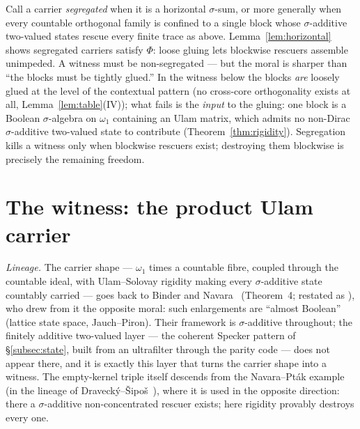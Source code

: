 \begin{remark}\label{rem:segregated}
Call a carrier \emph{segregated} when it is a horizontal $\sigma$-sum, or more
generally when every countable orthogonal family is confined to a single block
whose $\sigma$-additive two-valued states rescue every finite trace as above.
Lemma~\ref{lem:horizontal} shows segregated carriers satisfy $\Phi$: loose
gluing lets blockwise rescuers assemble unimpeded. A witness must be
non-segregated --- but the moral is sharper than ``the blocks must be tightly
glued.'' In the witness below the blocks \emph{are} loosely glued at the level of
the contextual pattern (no cross-core orthogonality exists at all,
Lemma~\ref{lem:table}(IV)); what fails is the \emph{input} to the gluing: one
block is a Boolean $\sigma$-algebra on $\omega_1$ containing an Ulam matrix,
which admits no non-Dirac $\sigma$-additive two-valued state to contribute
(Theorem~\ref{thm:rigidity}). Segregation kills a witness only when blockwise
rescuers exist; destroying them blockwise is precisely the remaining freedom.
\end{remark}


\section{The witness: the product Ulam carrier}\label{sec:witness}

\emph{Lineage.} The carrier shape --- $\omega_1$ times a countable fibre,
coupled through the countable ideal, with Ulam--Solovay rigidity making every
$\sigma$-additive state countably carried --- goes back to Binder and
Navara~\cite{BinderNavara1987} (Theorem~4; restated as \cite[Thm.~17.4]{Navara2000}),
who drew from it the opposite moral: such enlargements are ``almost Boolean''
(lattice state space, Jauch--Piron). Their framework is $\sigma$-additive
throughout; the finitely additive two-valued layer --- the coherent Specker
pattern of \S\ref{subsec:state}, built from an ultrafilter through the parity
code --- does not appear there, and it is exactly this layer that turns the
carrier shape into a witness. The empty-kernel triple itself descends from the
Navara--Pt\'ak example~\cite{NavaraPtak1983} (in the lineage of
Draveck\'y--\v{S}ipo\v{s}~\cite{DraveckySipos1980}), where it is used in the
opposite direction: there a $\sigma$-additive non-concentrated rescuer exists;
here rigidity provably destroys every one.

